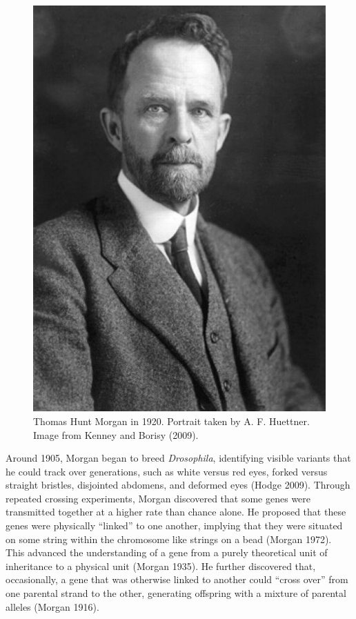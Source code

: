 \documentclass[
]{book}
\begin{document}
\begin{figure}

{\centering \includegraphics[width=0.8\linewidth]{figs/introduction/Thomas_Morgan} 

}

\caption{Thomas Hunt Morgan in 1920. Portrait taken by A. F. Huettner. Image from Kenney and Borisy (2009).}\label{fig:morgan}
\end{figure}

Around 1905, Morgan began to breed \emph{Drosophila}, identifying visible variants that he could track over generations, such as white versus red eyes, forked versus straight bristles, disjointed abdomens, and deformed eyes (Hodge 2009). Through repeated crossing experiments, Morgan discovered that some genes were transmitted together at a higher rate than chance alone. He proposed that these genes were physically ``linked'' to one another, implying that they were situated on some string within the chromosome like strings on a bead (Morgan 1972). This advanced the understanding of a gene from a purely theoretical unit of inheritance to a physical unit (Morgan 1935). He further discovered that, occasionally, a gene that was otherwise linked to another could ``cross over'' from one parental strand to the other, generating offspring with a mixture of parental alleles (Morgan 1916).
\end{document}
